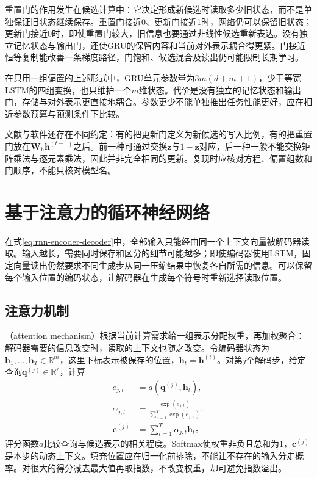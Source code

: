 重置门的作用发生在候选计算中：它决定形成新候选时读取多少旧状态，而不是单独保证旧状态继续保存。重置门接近0、更新门接近1时，网络仍可以保留旧状态；更新门接近0时，即使重置门较大，旧信息也要通过非线性候选重新表达。没有独立记忆状态与输出门，还使GRU的保留内容和当前对外表示耦合得更紧。门接近恒等复制能改善一条梯度路径，门饱和、候选混合及读出仍可能限制长期学习。

在只用一组偏置的上述形式中，GRU单元参数量为$3m(d+m+1)$，少于等宽LSTM的四组变换，也只维护一个$m$维状态。代价是没有独立的记忆状态和输出门，存储与对外表示更直接地耦合。参数更少不能单独推出任务性能更好，应在相近参数预算与预测条件下比较。

文献与软件还存在不同约定：有的把更新门定义为新候选的写入比例，有的把重置门放在$\bm{W}_{\mathrm{h}}\bm{h}^{(t-1)}$之后。前一种可通过交换$\bm{z}$与$1-\bm{z}$对应，后一种一般不能交换矩阵乘法与逐元素乘法，因此并非完全相同的更新。复现时应核对方程、偏置组数和门顺序，不能只核对模型名。

\section{基于注意力的循环神经网络}
\label{sec:rnn-attention}

在式\eqref{eq:rnn-encoder-decoder}中，全部输入只能经由同一个上下文向量被解码器读取。输入越长，需要同时保存和区分的细节可能越多；即使编码器使用LSTM，固定向量读出仍然要求不同生成步从同一压缩结果中恢复各自所需的信息。可以保留每个输入位置的编码状态，让解码器在生成每个符号时重新选择读取位置。

\subsection{注意力机制}
\label{sec:rnn-attention-mechanism}

（attention mechanism）根据当前计算需求给一组表示分配权重，再加权聚合：解码器需要的信息改变时，读取的上下文也随之改变。令编码器状态为$\bm{h}_1,\ldots,\bm{h}_T\in\mathbb{R}^{m}$，这里下标表示被保存的位置，$\bm{h}_t=\bm{h}^{(t)}$。对第$j$个解码步，给定查询$\bm{q}^{(j)}\in\mathbb{R}^{r}$，计算
\begin{equation}
  \begin{aligned}
    e_{j,t}&=a(\bm{q}^{(j)},\bm{h}_t),\\
    \alpha_{j,t}&=\frac{\exp(e_{j,t})}
       {\sum_{u=1}^{T}\exp(e_{j,u})},\\
    \bm{c}^{(j)}&=\sum_{t=1}^{T}\alpha_{j,t}\bm{h}_t\text{。}
  \end{aligned}
  \label{eq:rnn-attention}
\end{equation}
评分函数$a$比较查询与候选表示的相关程度。Softmax使权重非负且总和为1，$\bm{c}^{(j)}$是本步的动态上下文。填充位置应在归一化前排除，不能让不存在的输入分走概率。对很大的得分减去最大值再取指数，不改变权重，却可避免指数溢出。

